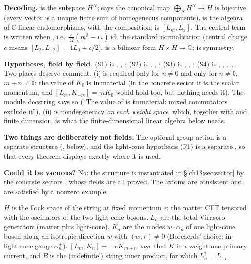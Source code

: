 \begin{dictionary}
\textbf{Decoding.}   is the subspace $H^N$;  says the
canonical map $\bigoplus_N H^N\to H$ is bijective (every vector is a unique finite sum of homogeneous
components).   is the algebra of $\mathbb C$-linear endomorphisms, with
\lean{*} the composition;  is $[L_m,L_n]$.  The central term is written
 when , i.e.\ $\frac{c}{12}(m^3-m)\,\mathrm{id}$,
the standard normalisation (central charge $c$ means $[L_2,L_{-2}]=4L_0+c/2$).
 is a bilinear form $H\times H\to\mathbb C$;  is symmetry.

\textbf{Hypotheses, field by field.}  (S1) is , , ;
(S2) is , , ; (S3) is , ,
; (S4) is , , , , .
Two places deserve comment.  (i)  is required only for $n\neq0$ and  only
for $n\neq0$, $m+n\neq0$: the value of $K_0$ is immaterial (in the concrete sector it is the scalar
momentum, and $[L_m,K_{-m}]=mK_0$ would hold too, but nothing needs it).  The module docstring
says so (``The value of  is immaterial: mixed commutators exclude it'').  (ii) 
is nondegeneracy \emph{on each weight space}, which, together with  and finite dimension,
is what the finite-dimensional linear algebra below needs.

\textbf{Two things are deliberately not fields.}  The optional group action is a separate structure
(, below), and the light-cone hypothesis (F1) is a separate , so that every theorem
displays exactly where it is used.

\textbf{Could it be vacuous?}  No: the structure is instantiated in \S\ref{ch18:sec:sector} by the
concrete sectors , whose fields are all proved.  The axioms are
consistent and are satisfied by a nonzero example.
\end{dictionary}

\begin{physics}
$H$ is the Fock space of the string at fixed momentum $r$: the matter CFT tensored with the oscillators
of the two light-cone bosons.  $L_n$ are the total Virasoro generators (matter plus light-cone), $K_n$
are the modes $w\cdot\alpha_n$ of one light-cone boson along an isotropic direction $w$ with $(w,r)\neq0$
(Borcherds' choice; in light-cone gauge $\alpha^+_n$).  $[L_m,K_n]=-nK_{m+n}$ says that $K$ is a
weight-one primary current, and $B$ is the (indefinite!) string inner product, for which $L_n^\dagger=L_{-n}$.
\end{physics}

